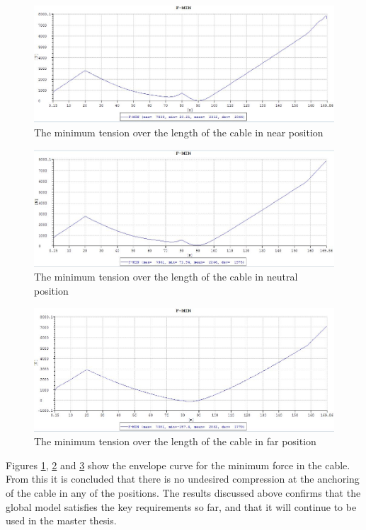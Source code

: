  \begin{figure}[H]
\centering
\includegraphics[scale=0.5]{figures/fminnear}
\caption[$\; \:$The minimum tension in near position ]{The minimum tension over the length of the cable in near position}
 \label{fig:fminnear}
\end{figure}


\begin{figure}[H]
\centering
\includegraphics[scale=0.5]{figures/fminneu}
\caption[$\; \:$The minimum tension in neutral position ]{The minimum tension over the length of the cable in neutral position}
 \label{fig:fminneu}
\end{figure}


\begin{figure}[H]
\centering
\includegraphics[scale=0.5]{figures/fminfar}
\caption[$\; \:$The minimum tension in far position ]{The minimum tension over the length of the cable in far position}
 \label{fig:fminfar}
\end{figure}
\noindent Figures \ref{fig:fminnear}, \ref{fig:fminneu} and \ref{fig:fminfar} show the envelope curve for the minimum force in the cable. From this it is concluded that there is no undesired compression at the anchoring of the cable in any of the positions.  
 \newline
 \newline
 \noindent The results discussed above confirms that the global model satisfies the key requirements so far, and that it will continue to be used in the master thesis. 

